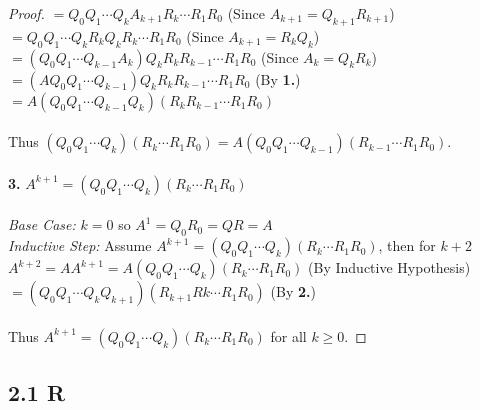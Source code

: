 \documentclass[12pt]{article}
\begin{document}
\begin{proof}
    \indent $= Q_0 Q_1 \cdots Q_k A_{k+1} R_k \cdots R_1 R_0$ (Since $A_{k+1} = Q_{k+1} R_{k+1}$) \\
    \indent $= Q_0 Q_1 \cdots Q_k R_k Q_k R_k \cdots R_1 R_0$ (Since $A_{k+1} = R_k Q_k$) \\
    \indent $= (Q_0 Q_1 \cdots Q_{k-1} A_k) Q_k R_k R_{k-1} \cdots R_1 R_0$ (Since $A_k = Q_k R_k$) \\
    \indent $= (AQ_0 Q_1 \cdots Q_{k-1}) Q_k R_k R_{k-1} \cdots R_1 R_0$ (By \textbf{1.}) \\
    \indent $= A(Q_0 Q_1 \cdots Q_{k-1} Q_k) (R_k R_{k-1} \cdots R_1 R_0)$ \\ \\
    Thus $(Q_0 Q_1 \cdots Q_k)(R_k \cdots R_1 R_0) = A(Q_0 Q_1 \cdots Q_{k-1})(R_{k-1} \cdots R_1 R_0)$. \\ \\
    \textbf{3.} $A^{k+1} = (Q_0 Q_1 \cdots Q_k) (R_k \cdots R_1 R_0)$ \\ \\
    \textit{Base Case:} $k = 0$ so $A^1 = Q_0 R_0 = QR = A$ \\
    \textit{Inductive Step:} Assume $A^{k+1} = (Q_0 Q_1 \cdots Q_k) (R_k \cdots R_1 R_0)$, then for $k+2$ \\
    \indent $A^{k+2} = A A^{k+1} = A (Q_0 Q_1 \cdots Q_k) (R_k \cdots R_1 R_0)$ (By Inductive Hypothesis) \\
    \indent $= (Q_0 Q_1 \cdots Q_kQ_{k+1})(R_{k+1}R{k} \cdots R_1 R_0)$ (By \textbf{2.}) \\ \\
    Thus $A^{k+1} = (Q_0 Q_1 \cdots Q_k) (R_k \cdots R_1 R_0)$ for all $k \geq 0$.
\end{proof}

\subsection{2.1 R}
\end{document}
